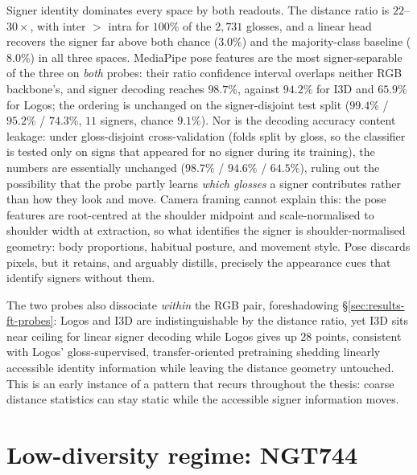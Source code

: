 Signer identity dominates every space by both readouts. The distance
ratio is $22$--$30\times$, with inter $>$ intra for $100\%$ of the
$2{,}731$ glosses, and a linear head recovers the signer far above both
chance ($3.0\%$) and the majority-class baseline ($8.0\%$) in all three
spaces. MediaPipe pose features are the most signer-separable of the
three on \emph{both} probes: their ratio confidence interval overlaps
neither RGB backbone's, and signer decoding reaches $98.7\%$, against
$94.2\%$ for I3D and $65.9\%$ for Logos; the ordering is unchanged on
the signer-disjoint test split ($99.4\%$ / $95.2\%$ / $74.3\%$, $11$
signers, chance $9.1\%$).
Nor is the decoding accuracy content leakage: under gloss-disjoint
cross-validation (folds split by gloss, so the classifier is tested
only on signs that appeared for no signer during its training), the
numbers are essentially unchanged ($98.7\%$ / $94.6\%$ / $64.5\%$),
ruling out the possibility that the probe partly learns \emph{which
glosses} a signer contributes rather than how they look and move.
Camera framing cannot explain this: the pose
features are root-centred at the shoulder midpoint and scale-normalised
to shoulder width at extraction, so what identifies the signer is
shoulder-normalised geometry: body proportions, habitual posture, and
movement style. Pose discards pixels, but it retains, and arguably
distills, precisely the appearance cues that identify signers without
them.

The two probes also dissociate \emph{within} the RGB pair, foreshadowing
\S\ref{sec:results-ft-probes}: Logos and I3D are indistinguishable by
the distance ratio, yet I3D sits near ceiling for linear signer decoding
while Logos gives up $28$ points, consistent with Logos' gloss-supervised,
transfer-oriented pretraining shedding linearly accessible identity
information while leaving the distance geometry untouched. This is an
early instance of a pattern that recurs throughout the thesis: coarse
distance statistics can stay static while the accessible signer
information moves.

\section{Low-diversity regime: NGT744}
\label{sec:results-lowdiv}


